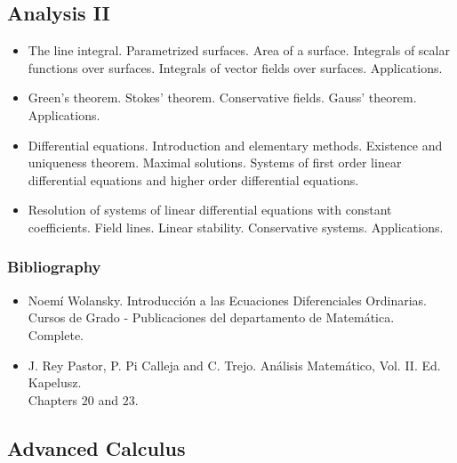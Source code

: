 \documentclass[spanish]{article}
\begin{document}
\hrulefill%
\subsection{Analysis II}

\begin{itemize}
  \item
The line integral. Parametrized surfaces. Area of a surface. Integrals of scalar functions over surfaces. Integrals of vector fields over surfaces. Applications.

  \item
Green's theorem. Stokes' theorem. Conservative fields. Gauss' theorem. Applications.

  \item
Differential equations. Introduction and elementary methods. Existence and uniqueness theorem. Maximal solutions. Systems of first order linear differential equations and higher order differential equations.

  \item
Resolution of systems of linear differential equations with constant coefficients. Field lines. Linear stability. Conservative systems. Applications.
\end{itemize}

\subsubsection{Bibliography}
\begin{itemize}
  \item Noem\'i Wolansky. Introducci\'on a las Ecuaciones Diferenciales Ordinarias.
    Cursos de Grado - Publicaciones del departamento de Matem\'atica.\\
    Complete.

  \item J. Rey Pastor, P. Pi Calleja and C. Trejo. Análisis Matemático, Vol. II. Ed. Kapelusz.\\
    Chapters $20$ and $23$.
\end{itemize}


\hrulefill%

\subsection{Advanced Calculus}
\end{document}
